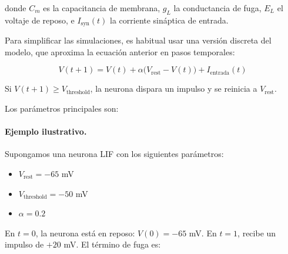 donde $C_m$ es la capacitancia de membrana, $g_L$ la conductancia de fuga, $E_L$ el voltaje de reposo, e $I_{\text{syn}}(t)$ la corriente sináptica de entrada.

Para simplificar las simulaciones, es habitual usar una versión discreta del modelo, que aproxima la ecuación anterior en pasos temporales:

\begin{equation}
V(t+1) = V(t) + \alpha \big(V_{\text{rest}} - V(t)\big) + I_{\text{entrada}}(t)
\label{eq:lif-discreto}
\end{equation}
  
Si $V(t+1) \geq V_{\text{threshold}}$, la neurona dispara un impulso y se reinicia a $V_{\text{rest}}$.

Los parámetros principales son:


\paragraph{Ejemplo ilustrativo.} Supongamos una neurona LIF con los siguientes parámetros:

\begin{itemize}
    \item $V_{} = -65$ mV
    \item $V_{} = -50$ mV
    \item $\alpha = 0.2$
\end{itemize}

En $t=0$, la neurona está en reposo: $V(0) = -65$ mV.  
En $t=1$, recibe un impulso de $+20$ mV. El término de fuga es:

